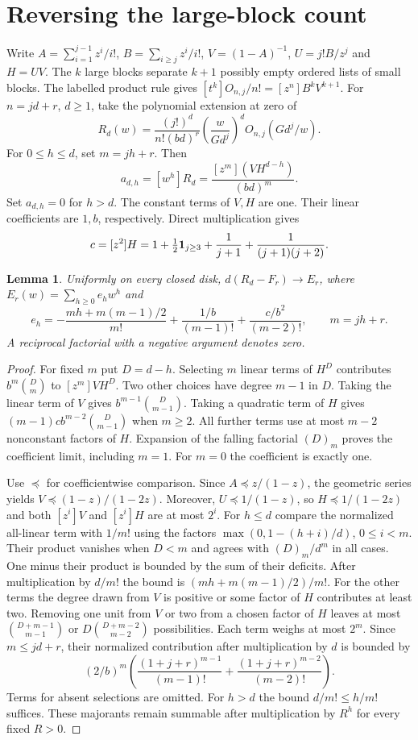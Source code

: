 \documentclass[11pt]{amsart}
\newtheorem{lemma}[theorem]{Lemma}
\begin{document}
\section{Reversing the large-block count}
Write $A=\sum_{i=1}^{j-1}z^i/i!$, $B=\sum_{i\ge j}z^i/i!$,
$V=(1-A)^{-1}$, $U=j!B/z^j$ and $H=UV$. The $k$ large blocks
separate $k+1$ possibly empty ordered lists of small blocks. The
labelled product rule gives $[t^k]O_{n,j}/n!=[z^n]B^kV^{k+1}$.
For $n=jd+r$, $d\ge1$, take the polynomial extension at zero of
\[
 R_d(w)=\frac{(j!)^d}{n!(bd)^r}
     \left(\frac{w}{Gd^j}\right)^d O_{n,j}(Gd^j/w).
\]
For $0\le h\le d$, set $m=jh+r$. Then
\[
  a_{d,h}=[w^h]R_d=\frac{[z^m](VH^{d-h})}{(bd)^m}.
\]
Set $a_{d,h}=0$ for $h>d$. The constant terms of $V,H$ are one.
Their linear coefficients
are $1,b$, respectively. Direct multiplication gives
\[
c=[z^2]H=1+\tfrac12{\bf1}_{j\ge3}+\frac1{j+1}+\frac1{(j+1)(j+2)}.
\]

\begin{lemma}\label{corr}
Uniformly on every closed disk, $d(R_d-F_r)\to E_r$, where
$E_r(w)=\sum_{h\ge0}e_hw^h$ and
\[
 e_h=-\frac{mh+m(m-1)/2}{m!}
      +\frac{1/b}{(m-1)!}+\frac{c/b^2}{(m-2)!},\qquad m=jh+r .
\]
A reciprocal factorial with a negative argument denotes zero.
\end{lemma}
\begin{proof}
For fixed $m$ put $D=d-h$. Selecting $m$ linear terms of $H^D$
contributes $b^m\binom Dm$ to $[z^m]VH^D$.
Two other choices have degree $m-1$ in $D$. Taking the linear term of $V$
gives $b^{m-1}\binom D{m-1}$. Taking a quadratic term of $H$ gives
$(m-1)cb^{m-2}\binom D{m-1}$ when $m\ge2$. All further
terms use at most $m-2$ nonconstant factors of $H$. Expansion of
the falling factorial $(D)_m$ proves the coefficient limit, including
$m=1$. For $m=0$ the coefficient is exactly one.

Use $\preceq$ for coefficientwise comparison. Since $A\preceq z/(1-z)$,
the geometric series yields $V\preceq(1-z)/(1-2z)$. Moreover,
$U\preceq1/(1-z)$, so $H\preceq1/(1-2z)$ and both $[z^i]V$ and
$[z^i]H$ are at most $2^i$. For $h\le d$ compare the normalized all-linear
term with $1/m!$ using the factors $\max(0,1-(h+i)/d)$, $0\le i<m$.
Their product vanishes when $D<m$ and agrees with $(D)_m/d^m$ in all cases.
One minus their product is bounded by the sum of their deficits. After
multiplication by $d/m!$ the bound is $(mh+m(m-1)/2)/m!$.
For the other terms the degree drawn from $V$ is positive or some
factor of $H$ contributes at least two. Removing one unit from $V$
or two from a chosen factor of $H$ leaves at most
$\binom{D+m-1}{m-1}$ or $D\binom{D+m-2}{m-2}$ possibilities.
Each term weighs at most $2^m$. Since $m\le jd+r$, their normalized
contribution after multiplication by $d$ is bounded by
\[
 (2/b)^m\left(\frac{(1+j+r)^{m-1}}{(m-1)!}
             +\frac{(1+j+r)^{m-2}}{(m-2)!}\right).
\]
Terms for absent selections are omitted. For $h>d$ the bound
$d/m!\le h/m!$ suffices. These majorants remain summable after
multiplication by $R^h$ for every fixed $R>0$.
\end{proof}
\end{document}

